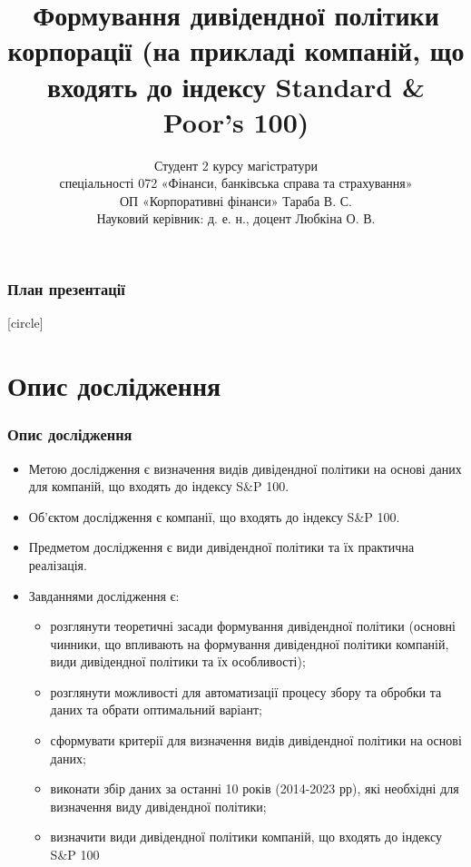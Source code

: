 \documentclass[aspectratio=169]{beamer}
\title{Формування дивідендної політики корпорації (на прикладі компаній, що входять до індексу Standard \& Poor's 100)}
\author{Студент 2 курсу магістратури\\спеціальності 072 «Фінанси, банківська справа та страхування»\\ОП «Корпоративні фінанси» Тараба В. С.\\ Науковий керівник: д. е. н., доцент Любкіна О. В.}
\institute{Київський національний університет імені Тараса Шевченка\\Економічний факультет\\Кафедра фінансів}
\begin{document}
	
\begin{frame}
\titlepage
\end{frame}

\begin{frame}
\frametitle{План презентації}
[circle]
\tableofcontents
\end{frame}

\section{Опис дослідження}

\begin{frame}
\frametitle{Опис дослідження}
\begin{itemize}
\item \alert {Метою дослідження} є визначення видів дивідендної політики на основі даних для компаній, що входять до індексу S&P 100.
\tinyskip
\item \alert {Об’єктом дослідження} є компанії, що входять до індексу S&P 100.
\tinyskip
\item \alert {Предметом дослідження} є види дивідендної політики та їх практична реалізація.
\tinyskip
\item \alert {Завданнями дослідження} є:
\begin{itemize}
    \item[\textcolor{orange}{\textbullet}] розглянути теоретичні засади формування дивідендної політики (основні чинники, що впливають на формування дивідендної політики компаній, види дивідендної політики та їх особливості); 
    \item[\textcolor{orange}{\textbullet}] розглянути можливості для автоматизації процесу збору та обробки та даних та обрати оптимальний варіант; 
    \item[\textcolor{orange}{\textbullet}] сформувати критерії для визначення видів дивідендної політики на основі даних;
    \item[\textcolor{orange}{\textbullet}] виконати збір даних за останні 10 років (2014-2023 рр), які необхідні для визначення виду дивідендної політики;
    \item[\textcolor{orange}{\textbullet}] визначити види дивідендної політики компаній, що входять до індексу S\&P 100
\end{itemize}
\end{itemize}
\end{frame}
\end{document}
